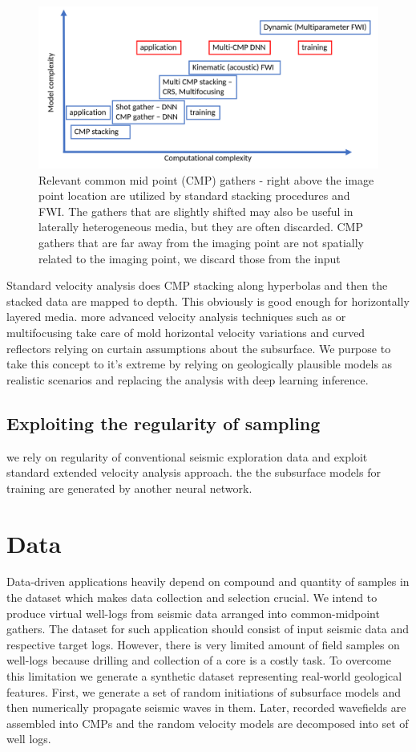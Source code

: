 \documentclass[manuscript]{geophysics}
\begin{document}
\begin{figure}
	\centering
	\includegraphics[width=0.9\linewidth]{Fig/learningParadigm}
	\caption{Relevant common mid point (CMP) gathers - right above the image point location are utilized by standard stacking procedures and FWI. The gathers that are slightly shifted may also be useful in laterally heterogeneous media, but they are often discarded. CMP gathers that are far away from the imaging point are not spatially related to the imaging point, we discard those from the input}
	\label{fig:learningParadigm}
\end{figure}

Standard velocity analysis does CMP stacking along hyperbolas and then the stacked data are mapped to depth. This obviously is good enough for horizontally layered media. more advanced velocity analysis techniques such as  or multifocusing take care of mold horizontal velocity variations and curved reflectors relying on curtain assumptions about the subsurface. We purpose to take this concept to it's extreme by relying on geologically plausible models as realistic scenarios and replacing the analysis with deep learning inference.

\subsection{Exploiting the regularity of sampling}
we rely on regularity of conventional seismic exploration data and exploit standard extended velocity analysis approach.  the
the subsurface models for training are generated by another neural network.


\section{Data}
Data-driven applications heavily depend on compound and quantity of samples in the dataset which makes data collection and selection crucial. 
%
We intend to produce virtual well-logs from seismic data arranged into common-midpoint gathers. The dataset for such application should consist of input seismic data and respective target logs. However, there is very limited amount of field samples on well-logs because drilling and collection of a core is a costly task. 
%
To overcome this limitation we generate a synthetic dataset representing real-world geological features. First, we generate a set of random initiations of subsurface models and then numerically propagate seismic waves in them. Later, recorded wavefields are assembled into CMPs and the random velocity models are decomposed into set of well logs.
\end{document}
